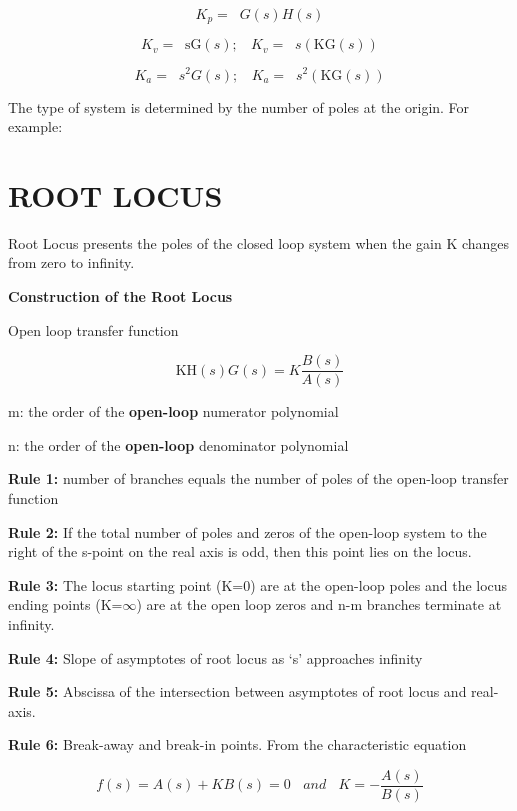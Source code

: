 \begin{multicols}{3}
\[K_{p} = \operatorname{}{G\left( s \right)H(s)}\]

\[K_{v} = \operatorname{}{\text{sG}\left( s \right);\ \ \ \ K_{v} = \operatorname{}{s\left( \text{KG}\left( s \right) \right)}}\]

\[K_{a} = \operatorname{}{s^{2}G\left( s \right);\ \ \ \ K_{a} = \operatorname{}{s^{2}\left( \text{KG}\left( s \right) \right)}}\]

The type of system is determined by the number of poles at the origin.
For example:


\section{ROOT LOCUS}

Root Locus presents the poles of the closed loop system when the gain K
changes from zero to infinity.

\textbf{Construction of the Root Locus}

Open loop transfer function

\[\text{KH}\left( s \right)G\left( s \right) = K\frac{B(s)}{A(s)}\]

m: the order of the \textbf{open-loop} numerator polynomial

n: the order of the \textbf{open-loop} denominator polynomial

\textbf{Rule 1:} number of branches equals the number of poles of the
open-loop transfer function

\textbf{Rule 2:} If the total number of poles and zeros of the open-loop
system to the right of the s-point on the real axis is odd, then this
point lies on the locus.

\textbf{Rule 3:} The locus starting point (K=0) are at the open-loop
poles and the locus ending points (K=$\infty$) are at the open loop zeros and
n-m branches terminate at infinity.

\textbf{Rule 4:} Slope of asymptotes of root locus as `s' approaches
infinity

\textbf{Rule 5:} Abscissa of the intersection between asymptotes of root
locus and real-axis.


\textbf{Rule 6:} Break-away and break-in points. From the characteristic
equation

\[f\left( s \right) = A\left( s \right) + KB\left( s \right) = 0\ \ \ \ and\ \ \ \ K = - \frac{A\left( s \right)}{B\left( s \right)}\]


\end{multicols}
